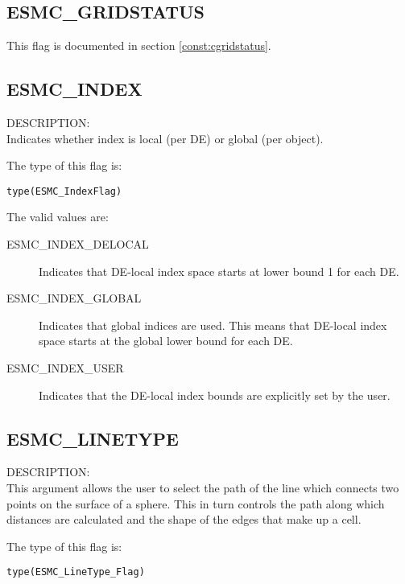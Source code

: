\subsection{ESMC\_GRIDSTATUS}
This flag is documented in section \ref{const:cgridstatus}.

\subsection{ESMC\_INDEX}
\label{const:indexflag}

{\sf DESCRIPTION:\\}
Indicates whether index is local (per DE) or global (per object).

The type of this flag is:

{\tt type(ESMC\_IndexFlag)}

The valid values are:
\begin{description}
\item [ESMC\_INDEX\_DELOCAL]
      Indicates that DE-local index space starts at lower bound 1 for each DE.
\item [ESMC\_INDEX\_GLOBAL]
      Indicates that global indices are used. This means that DE-local index
      space starts at the global lower bound for each DE.
\item [ESMC\_INDEX\_USER]
      Indicates that the DE-local index bounds are explicitly set by the user.
\end{description}

\subsection{ESMC\_LINETYPE}
\label{opt:lineType}

{\sf DESCRIPTION:\\}  This argument allows the user to select the path of the 
line which connects two points on the surface of a sphere.
This in turn controls the path along which distances are calculated and the 
shape of the edges that make up a cell.

The type of this flag is:

{\tt type(ESMC\_LineType\_Flag)}

